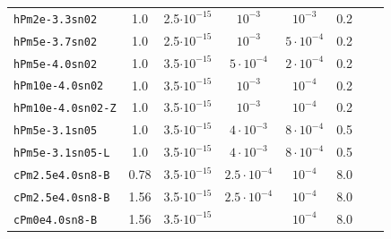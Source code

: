 \documentclass[preprint2]{aastex63}
\begin{document}
\begin{table}
\begin{tabular}{lccccccc}
\texttt{hPm2e-3.3sn02  } & 1.0 & 2.5$\cdot10^{-15}$  & $      10^{-3}$  & $      10^{-3}$ &  0.2  \\
\texttt{hPm5e-3.7sn02  } & 1.0 & 2.5$\cdot10^{-15}$  & $      10^{-3}$  & $5\cdot10^{-4}$ &  0.2  \\
\texttt{hPm5e-4.0sn02  } & 1.0 & 3.5$\cdot10^{-15}$  & $5\cdot10^{-4}$  & $2\cdot10^{-4}$ &  0.2  \\
\texttt{hPm10e-4.0sn02  }& 1.0 & 3.5$\cdot10^{-15}$  & $      10^{-3}$  & $      10^{-4}$ &  0.2  \\
\texttt{hPm10e-4.0sn02-Z}& 1.0 & 3.5$\cdot10^{-15}$  & $      10^{-3}$  & $      10^{-4}$ &  0.2  \\
\texttt{hPm5e-3.1sn05}   & 1.0 & 3.5$\cdot10^{-15}$  & $4\cdot10^{-3}$  & $8\cdot10^{-4}$ &  0.5  \\
\texttt{hPm5e-3.1sn05-L} & 1.0 & 3.5$\cdot10^{-15}$  & $4\cdot10^{-3}$  & $8\cdot10^{-4}$ &  0.5  \\
\texttt{cPm2.5e4.0sn8-B} &0.78 & 3.5$\cdot10^{-15}$  &$2.5\cdot10^{-4}$ & $      10^{-4}$ &  8.0  \\
\texttt{cPm2.5e4.0sn8-B} &1.56 & 3.5$\cdot10^{-15}$  &$2.5\cdot10^{-4}$ & $      10^{-4}$ &  8.0  \\
\texttt{cPm0e4.0sn8-B}   &1.56 & 3.5$\cdot10^{-15}$  &                  & $      10^{-4}$ &  8.0  
\end{tabular}
\end{table}
\end{document}
